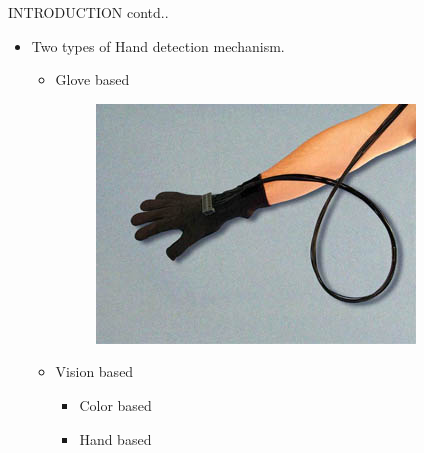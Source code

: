 \documentclass{beamer}
\begin{document}
\begin{frame}{INTRODUCTION contd..}
\begin{itemize}
\item Two types of Hand detection mechanism.
\begin{itemize}
\item Glove based
\begin{figure}
\begin{center}
\includegraphics[scale=0.5]{images/glove.jpg}
\end{center}
\end{figure}
\item \alert{Vision based}
\begin{itemize}
\item Color based
\vspace{.5 cm}
\item Hand based
\end{itemize}
\end{itemize}


\end{itemize}
\end{frame}
\end{document}
